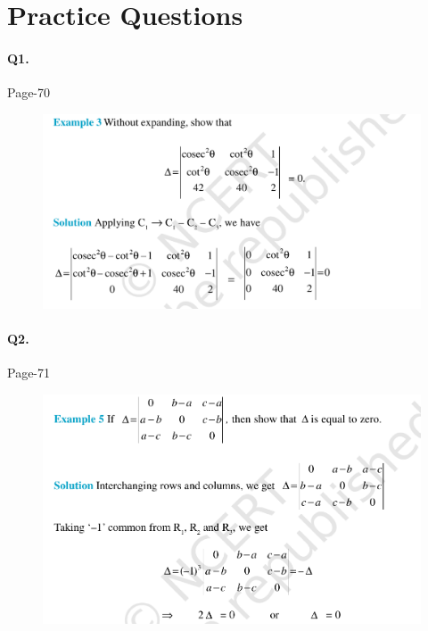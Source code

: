 \documentclass{article}
\begin{document}
\section*{Practice Questions}
\paragraph{Q1.}
\begin{flushright}
Page-70
\end{flushright}

\begin{figure}[H]
    \includegraphics[scale=0.5]{determinants_l2_ps_1.png}
\end{figure}
\clearpage
\paragraph{Q2.}
\begin{flushright}
Page-71
\end{flushright}

\begin{figure}[H]
    \includegraphics[scale=0.5]{determinants_l2_ps_2.png}
\end{figure}
\clearpage
\end{document}

